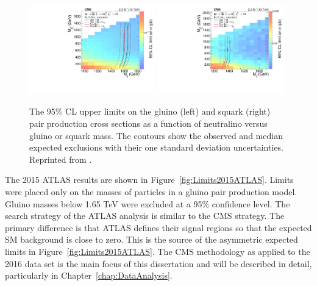 \begin{figure}[h]
\begin{center}
\includegraphics[width=0.49\textwidth]{Figures/Theory/2015gg.pdf}
\includegraphics[width=0.49\textwidth]{Figures/Theory/2015qq.pdf}
\end{center}
    \caption[The 95\% CL upper limits on the gluino and squark 
        pair production cross sections as a function of neutralino versus
	gluino or squark mass.]
    {The 95\% CL upper limits on the gluino (left) and squark (right)
        pair production cross sections as a function of neutralino versus
	gluino or squark mass. The contours show the observed and median
        expected exclusions with their one
        standard deviation uncertainties. Reprinted from \cite{CMS:2015_anal}.}
    \label{fig:Limits2015CMS}
\end{figure}

The 2015 ATLAS results are shown in Figure~\ref{fig:Limits2015ATLAS}. 
Limits were placed only on the masses of particles in a gluino pair production model. 
Gluino masses below 1.65 TeV were excluded at a 95\% confidence level.
The search strategy of the ATLAS analysis is similar to the CMS strategy. 
The primary difference is that ATLAS defines their signal regions so that the expected SM background is close to zero. 
This is the source of the asymmetric expected limits in Figure~\ref{fig:Limits2015ATLAS}.
The CMS methodology as applied to the 2016 data set is the main focus of this dissertation and 
will be described in detail, particularly in Chapter~\ref{chap:DataAnalysis}. 


